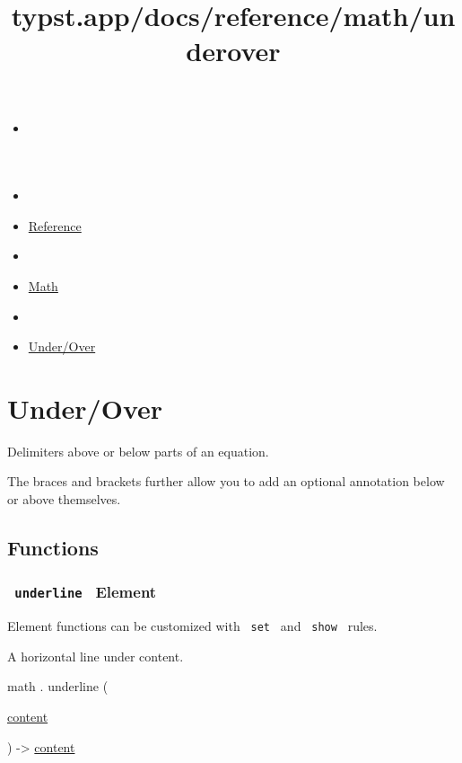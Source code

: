 \title{typst.app/docs/reference/math/underover}

\begin{itemize}
\tightlist
\item
  \href{/docs}{}
\item
  
\item
  \href{/docs/reference/}{Reference}
\item
  
\item
  \href{/docs/reference/math/}{Math}
\item
  
\item
  \href{/docs/reference/math/underover}{Under/Over}
\end{itemize}

\section{Under/Over}\label{summary}

Delimiters above or below parts of an equation.

The braces and brackets further allow you to add an optional annotation
below or above themselves.

\subsection{Functions}\label{functions}

\subsubsection{\texorpdfstring{\texttt{\ underline\ } {{ Element
}}}{ underline   Element }}\label{functions-underline}

\label{functions-underline-element-tooltip}
Element functions can be customized with \texttt{\ set\ } and
\texttt{\ show\ } rules.

A horizontal line under content.

math { . } { underline } (

{ \href{/docs/reference/foundations/content/}{content} }

) -\textgreater{} \href{/docs/reference/foundations/content/}{content}

